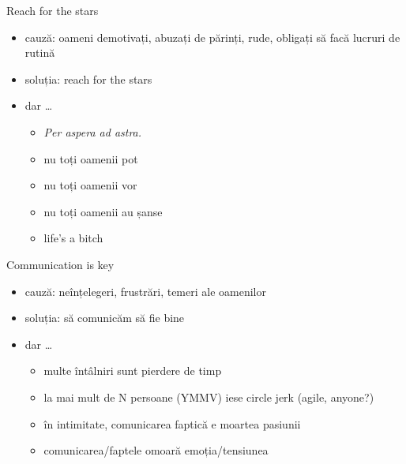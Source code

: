 \documentclass{beamer}
\begin{document}
\begin{frame}{Reach for the stars}
  \begin{itemize}
    \pause \item cauză: oameni demotivați, abuzați de părinți, rude, obligați să facă lucruri de rutină
    \pause \item soluția: reach for the stars
    \pause \item dar \ldots
      \begin{itemize}
        \pause \item \textit{Per aspera ad astra.}
        \pause \item nu toți oamenii pot
        \pause \item nu toți oamenii vor
        \pause \item nu toți oamenii au șanse
        \pause \item life's a bitch
      \end{itemize}
  \end{itemize}
\end{frame}

\begin{frame}{Communication is key}
  \begin{itemize}
    \pause \item cauză: neînțelegeri, frustrări, temeri ale oamenilor
    \pause \item soluția: să comunicăm să fie bine
    \pause \item dar \ldots
      \begin{itemize}
        \pause \item multe întâlniri sunt pierdere de timp
        \pause \item la mai mult de N persoane (YMMV) iese circle jerk (agile, anyone?)
        \pause \item în intimitate, comunicarea faptică e moartea pasiunii
        \pause \item comunicarea/faptele omoară emoția/tensiunea
      \end{itemize}
  \end{itemize}
\end{frame}
\end{document}
